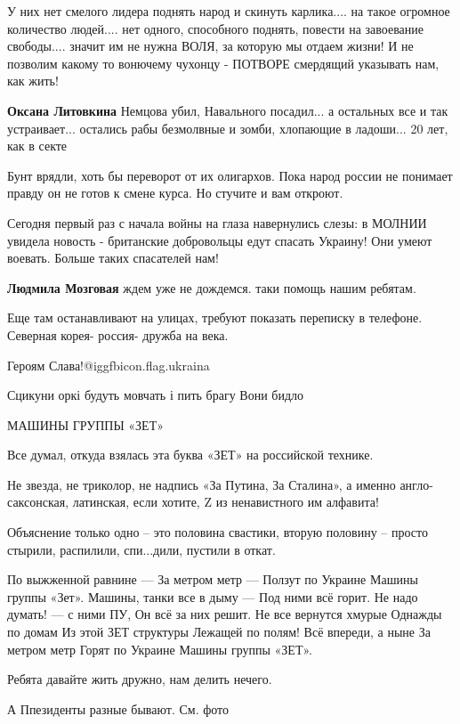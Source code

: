 \begin{itemize}
У них нет смелого лидера поднять народ и скинуть карлика.... на такое огромное
количество людей.... нет одного, способного поднять, повести на завоевание
свободы.... значит им не нужна ВОЛЯ, за которую мы отдаем жизни! И не позволим
какому то вонючему чухонцу - ПОТВОРЕ смердящий указывать нам, как жить!

\begin{itemize} %
\textbf{Оксана Литовкина} Немцова убил, Навального посадил... а остальных все и так устраивает... остались рабы безмолвные и зомби, хлопающие в ладоши... 20 лет, как в секте
\end{itemize} %


Бунт врядли, хоть бы переворот от их олигархов. Пока народ россии не понимает
правду он не готов к смене курса. Но стучите и вам откроют.



Сегодня первый раз с начала войны на глаза навернулись слезы: в МОЛНИИ увидела
новость - британские добровольцы едут спасать Украину! Они умеют воевать. Больше
таких спасателей нам!


\textbf{Людмила Мозговая} ждем уже не дождемся. таки помощь нашим ребятам.


Еще там останавливают на улицах, требуют показать переписку в телефоне.
Северная корея- россия- дружба на века.

Героям Слава!@igg{fbicon.flag.ukraina}

Сцикуни оркі будуть мовчать і пить брагу
Вони бидло


МАШИНЫ ГРУППЫ «ЗЕТ»

Все думал, откуда взялась эта буква «ЗЕТ» на российской технике.

Не звезда, не триколор, не надпись «За Путина, За Сталина», а именно
англо-саксонская, латинская, если хотите, Z из ненавистного им алфавита!

Объяснение только одно – это половина свастики, вторую половину – просто
стырили, распилили, спи...дили, пустили в откат.

\raggedcolumns
\begin{multicols}{2} %
\setlength{\parindent}{0pt}
\obeycr
По выжженной равнине —
За метром метр —
Ползут по Украине
Машины группы «Зет».
\smallskip
Машины, танки все в дыму —
Под ними всё горит.
Не надо думать! — с ними ПУ,
Он всё за них решит.
\smallskip
Не все вернутся хмурые
Однажды по домам
Из этой ЗЕТ структуры
Лежащей по полям!
\smallskip
Всё впереди, а ныне
За метром метр
Горят по Украине
Машины группы «ЗЕТ».
\restorecr
\end{multicols} %

Ребята давайте жить дружно, нам делить нечего.

А Ппезиденты разные бывают. См. фото


\end{itemize} %
